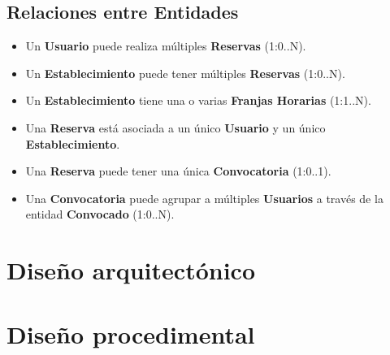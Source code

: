 \subsection{Relaciones entre Entidades}
\begin{itemize}
    \item Un \textbf{Usuario} puede realiza múltiples \textbf{Reservas} (1:0..N).
    \item Un \textbf{Establecimiento} puede tener múltiples \textbf{Reservas} (1:0..N).
    \item Un \textbf{Establecimiento} tiene una o varias \textbf{Franjas Horarias} (1:1..N).
    \item Una \textbf{Reserva} está asociada a un único \textbf{Usuario} y un único \textbf{Establecimiento}.
    \item Una \textbf{Reserva} puede tener una única \textbf{Convocatoria} (1:0..1).
    \item Una \textbf{Convocatoria} puede agrupar a múltiples \textbf{Usuarios} a través de la entidad \textbf{Convocado} (1:0..N).
\end{itemize}



\section{Diseño arquitectónico}

\section{Diseño procedimental}



